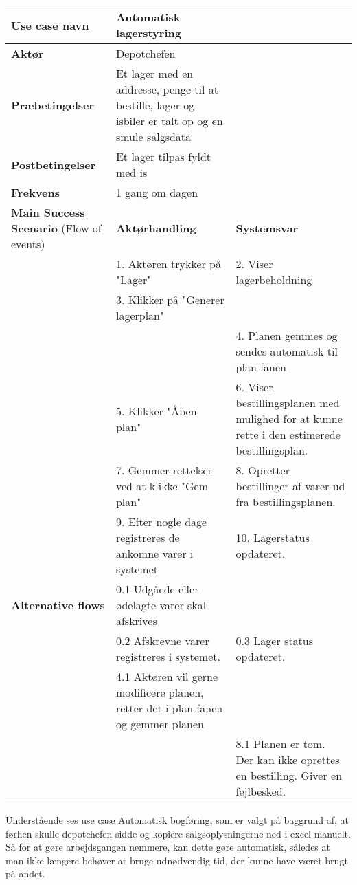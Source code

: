 \begin{longtable}{ |p{120pt}|p{120pt}|p{120pt}| }
    \hline
    \textbf{Use case navn} & Automatisk lagerstyring & \\
    \hline
    \textbf{Aktør} & Depotchefen & \\
    \hline
    \textbf{Præbetingelser} & Et lager med en addresse, penge til at bestille, lager og isbiler er talt op og en smule salgsdata & \\
    \hline
    \textbf{Postbetingelser} & Et lager tilpas fyldt med is & \\
    \hline
    \textbf{Frekvens} & 1 gang om dagen & \\
    \hline
    \textbf{Main Success Scenario} (Flow of events) & \textbf{Aktørhandling} & \textbf{Systemsvar} \\
    \hline
    & 1. Aktøren trykker på "Lager" & 2. Viser lagerbeholdning \\
    \hline
    & 3. Klikker på "Generer lagerplan" &  \\
    & & 4. Planen gemmes og sendes automatisk til plan-fanen \\
    \hline
    & 5. Klikker "Åben plan" & 6. Viser bestillingsplanen med mulighed for at kunne rette i den estimerede bestillingsplan. \\
    \hline
    & 7. Gemmer rettelser ved at klikke "Gem plan" & 8. Opretter bestillinger af varer ud fra bestillingsplanen. \\
    \hline
    & 9. Efter nogle dage registreres de ankomne varer i systemet & 10. Lagerstatus opdateret. \\
    \hline
    \textbf{Alternative flows} & 0.1 Udgåede eller ødelagte varer skal afskrives & \\
    \hline
    & 0.2 Afskrevne varer registreres i systemet. & 0.3 Lager status opdateret. \\
    \hline
    & 4.1 Aktøren vil gerne modificere planen, retter det i plan-fanen og gemmer planen & \\
    \hline
    & & 8.1 Planen er tom. Der kan ikke oprettes en bestilling. Giver en fejlbesked. \\
    \hline
\end{longtable}


Understående ses use case Automatisk bogføring, som er valgt på baggrund af, at førhen skulle depotchefen sidde og kopiere salgsoplysningerne ned i excel manuelt. Så for at gøre arbejdsgangen nemmere, kan dette gøre automatisk, således at man ikke længere behøver at bruge udnødvendig tid, der kunne have været brugt på andet. 

